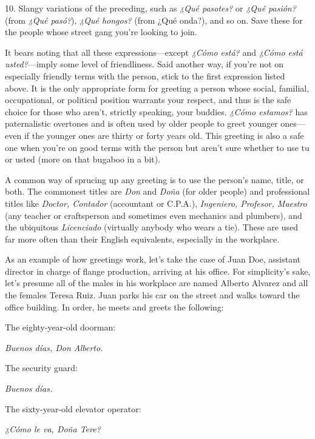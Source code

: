 \documentclass[14pt,a4paper,oneside]{memoir}
\newcommand{\bsk}{\vspace{20pt}}
\newcommand{\inda}{\hspace{40pt}}
\newcommand{\indu}{\hspace{20pt}}
\begin{document}
10. Slangy variations of the preceding, such as \emph{¿Qué pasotes?}
or \emph{¿Qué pasión?} (from \emph{¿Qué pasó?}), \emph{¿Qué hongos?} (from ¿Qué onda?),
and so on. Save these for the people whose street gang you're looking
to join.

\bsk

It bears noting that all these expressions---except \emph{¿Cómo está?}
and \emph{¿Cómo está usted?}---imply some level of friendliness. Said another way, if you're not on especially friendly terms with the person,
stick to the first expression listed above. It is the only appropriate
form for greeting a person whose social, familial, occupational, or political position warrants your respect, and thus is the safe choice for
those who aren't, strictly speaking, your buddies. \emph{¿Cómo estamos?} has
paternalistic overtones and is often used by older people to greet
younger ones---even if the younger ones are thirty or forty years old.
This greeting is also a safe one when you're on good terms with the
person but aren't sure whether to use tu or usted (more on that bugaboo in a bit).

A common way of sprucing up any greeting is to use the person's name, title, or both. The commonest titles are \emph{Don} and \emph{Doña}
(for older people) and professional titles like \emph{Doctor, Contador} (accountant or C.P.A.), \emph{Ingeniero, Profesor, Maestro} (any teacher or craftsperson and sometimes even mechanics and plumbers), and the ubiquitous \emph{Licenciado} (virtually anybody who wears a tie). These are used far
more often than their English equivalents, especially in the workplace.

As an example of how greetings work, let's take the case of
Juan Doe, assistant director in charge of flange production, arriving at
his office. For simplicity's sake, let's presume all of the males in his
workplace are named Alberto Alvarez and all the females Teresa Ruiz.
Juan parks his car on the street and walks toward the office building. In
order, he meets and greets the following:

\bsk

\inda The eighty-year-old doorman:

\indu \emph{Buenos días, Don Alberto.}

\inda The security guard:

\indu \emph{Buenos días.}

\inda The sixty-year-old elevator operator:

\indu \emph{¿Cómo le va, Doña Tere?}
\end{document}
